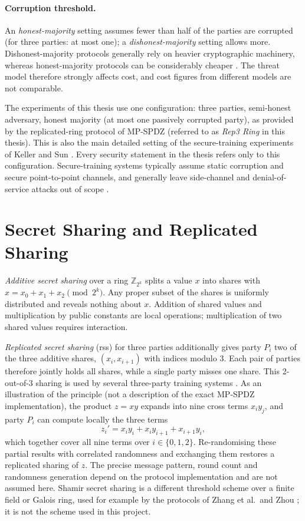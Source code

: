 \paragraph{Corruption threshold.} An \emph{honest-majority} setting assumes fewer than half of the parties are corrupted (for three parties: at most one); a \emph{dishonest-majority} setting allows more. Dishonest-majority protocols generally rely on heavier cryptographic machinery, whereas honest-majority protocols can be considerably cheaper \cite{keller2020mpspdz}. The threat model therefore strongly affects cost, and cost figures from different models are not comparable.

The experiments of this thesis use one configuration: three parties, semi-honest adversary, honest majority (at most one passively corrupted party), as provided by the replicated-ring protocol of MP-SPDZ (referred to as \emph{Rep3 Ring} in this thesis). This is also the main detailed setting of the secure-training experiments of Keller and Sun \cite{keller2022sqt}. Every security statement in the thesis refers only to this configuration. Secure-training systems typically assume static corruption and secure point-to-point channels, and generally leave side-channel and denial-of-service attacks out of scope \cite{yang2025esmpc,wagh2021falcon}.

\section{Secret Sharing and Replicated Sharing}\label{sec:bg-sharing}
\emph{Additive secret sharing} over a ring $\mathbb{Z}_{2^k}$ splits a value $x$ into shares with $x = x_0 + x_1 + x_2 \pmod{2^k}$. Any proper subset of the shares is uniformly distributed and reveals nothing about $x$. Addition of shared values and multiplication by public constants are local operations; multiplication of two shared values requires interaction.

\emph{Replicated secret sharing} (\ac{rss}) for three parties additionally gives party $P_i$ two of the three additive shares, $(x_i, x_{i+1})$ with indices modulo $3$. Each pair of parties therefore jointly holds all shares, while a single party misses one share. This 2-out-of-3 sharing is used by several three-party training systems \cite{wagh2021falcon,tan2021cryptgpu,keller2022sqt}. As an illustration of the principle (not a description of the exact MP-SPDZ implementation), the product $z = xy$ expands into nine cross terms $x_i y_j$, and party $P_i$ can compute locally the three terms
\begin{equation}
  z_i' = x_i y_i + x_i y_{i+1} + x_{i+1} y_i ,
  \label{eq:rss-mult}
\end{equation}
which together cover all nine terms over $i\in\{0,1,2\}$. Re-randomising these partial results with correlated randomness and exchanging them restores a replicated sharing of $z$. The precise message pattern, round count and randomness generation depend on the protocol implementation and are not assumed here. Shamir secret sharing is a different threshold scheme over a finite field or Galois ring, used for example by the protocols of Zhang et al.\ and Zhou \cite{zhang2025efficient,zhou2026rmfe}; it is not the scheme used in this project.

